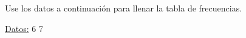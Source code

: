 \documentclass{cdplf-prueba}
\begin{document}
\subsection{}

Use los datos a continuación para llenar la tabla de frecuencias.

\underline{Datos:} \hspace{4pt} 6 \hspace{4pt}\textbullet\hspace{4pt} 7 \hspace{4pt}\textbullet\hspa
\end{document}
